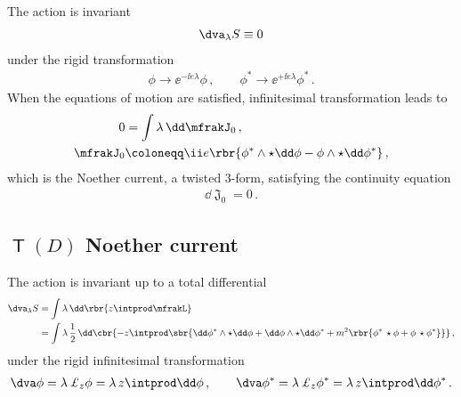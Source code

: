 \documentclass[a4paper]{article}
\begin{document}

The action is invariant
\begin{align}
\dva_{\lambda} S \equiv 0
\end{align}
under the rigid transformation
\begin{align}
\phi \to \ee^{-\ii e \lambda} \phi\,,\qquad
\phi^* \to \ee^{+\ii e \lambda} \phi^*\,.
\end{align}
When the equations of motion are satisfied, infinitesimal 
transformation leads to
\begin{align}
0 &= \int \lambda\, \dd \mfrakJ_0\,,
\nonumber \\
\mfrakJ_0 &\coloneqq \ii e\rbr{\phi^*\wedge\star\dd\phi
	- \phi\wedge\star\dd\phi^*}\,,
\end{align}
which is the Noether current, a twisted $3$-form, satisfying the continuity 
equation
\begin{align}
\dd \mfrakJ_0 = 0\,.
\end{align}

\subsection[$T(D)$ Noether current]{$\msansT(D)$ Noether current}

The action is invariant up to a total differential
\begin{align}
\dva_{\lambda} S &= \int \lambda\,\dd\rbr{z \intprod \mfrakL}
\nonumber \\
&= \int \lambda\,\frac{1}{2}\,\dd\cbr{
	- z\intprod\sbr{\dd\phi^*\wedge\star\dd\phi +
	\dd\phi\wedge\star\dd\phi^* +
	m^2\rbr{\phi^*\,\star\phi
	+\phi\,\star\phi^*}}}\,,
\end{align}
under the rigid infinitesimal transformation
\begin{align}
\dva\phi = \lambda\, \pounds_z \phi = \lambda\, z \intprod \dd \phi\,,\qquad
\dva\phi^* = \lambda\, \pounds_z \phi^* = \lambda\, z \intprod \dd \phi^*\,.
\end{align}
\end{document}
